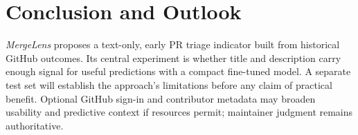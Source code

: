 \documentclass[conference,a4paper,flushend]{cs-techrep}
\begin{document}
\section{Conclusion and Outlook}
\emph{MergeLens} proposes a text-only, early PR triage indicator built from historical GitHub outcomes. Its central experiment is whether title and description carry enough signal for useful predictions with a compact fine-tuned model. A separate test set will establish the approach's limitations before any claim of practical benefit. Optional GitHub sign-in and contributor metadata may broaden usability and predictive context if resources permit; maintainer judgment remains authoritative.

\printbibliography[notcategory=selfref,resetnumbers=true,heading=bibintoc,title={References}]
\end{document}
